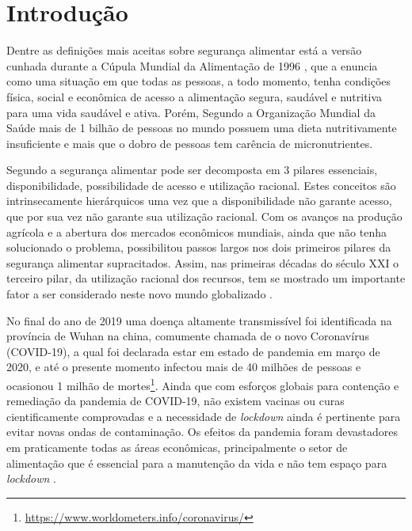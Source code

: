 \chapter{Introdução}


\noindent

Dentre as definições mais aceitas sobre segurança alimentar está a versão cunhada durante a Cúpula Mundial da Alimentação de 1996 \cite{shaw2007world}, que a enuncia como uma situação em que todas as pessoas, a todo momento, tenha condições física, social e econômica de acesso a alimentação segura, saudável e nutritiva para uma vida saudável e ativa. Porém, Segundo a Organização Mundial da Saúde \cite{world2009global} mais de 1 bilhão de pessoas no mundo possuem uma dieta nutritivamente insuficiente e mais que o dobro de pessoas tem carência de micronutrientes.

Segundo  a segurança alimentar pode ser decomposta em 3 pilares essenciais, disponibilidade, possibilidade de acesso e utilização racional. Estes conceitos são intrinsecamente hierárquicos uma vez que a disponibilidade não garante acesso, que por sua vez não garante sua utilização racional. Com os avanços na produção agrícola e a abertura dos mercados econômicos mundiais, ainda que não tenha solucionado o problema, possibilitou passos largos nos dois primeiros pilares da segurança alimentar supracitados. Assim, nas primeiras décadas do século XXI o terceiro pilar, da utilização racional dos recursos, tem se mostrado um importante fator a ser considerado neste novo mundo globalizado \cite{barrett2010}.

No final do ano de 2019 uma doença altamente transmissível foi identificada na província de Wuhan na china, comumente chamada de o novo Coronavírus (COVID-19), a qual foi declarada estar em estado de  pandemia em março de 2020, e até o presente momento infectou mais de 40 milhões de pessoas e ocasionou 1 milhão de mortes\footnote{\url{https://www.worldometers.info/coronavirus/}}. Ainda que com esforços globais para contenção e remediação da pandemia de COVID-19, não existem vacinas ou curas cientificamente comprovadas e a necessidade de \textit{lockdown} ainda é pertinente para evitar novas ondas de contaminação. Os efeitos da pandemia foram devastadores em praticamente todas as áreas econômicas, principalmente o setor de alimentação que é essencial para a manutenção da vida e não tem espaço para \textit{lockdown} \cite{galanakis2020food}.

